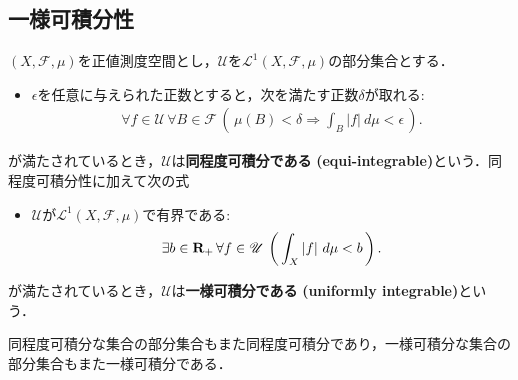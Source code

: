\subsection{一様可積分性}
	\begin{screen}
		\begin{dfn}[一様可積分]
			$(X,\mathscr{F},\mu)$を正値測度空間とし，$\mathscr{U}$を$\mathscr{L}^1(X,\mathscr{F},\mu)$の部分集合とする．
			\begin{itemize}
				\item $\epsilon$を任意に与えられた正数とすると，次を満たす正数$\delta$が取れる:
					\begin{align}
						\forall f \in \mathscr{U}\, \forall B \in \mathscr{F}\, \left(\, \mu(B) < \delta
						\Longrightarrow \int_B |f|\ d\mu < \epsilon\, \right).
					\end{align}
			\end{itemize}
			が満たされているとき，$\mathscr{U}$は{\bf 同程度可積分である}
			{\bf (equi-integrable)}という．同程度可積分性に加えて次の式
			\begin{itemize}
				\item $\mathscr{U}$が$\mathscr{L}^1(X,\mathscr{F},\mu)$で有界である:
					\begin{align}
						\exists b \in \mathbf{R}_+\, \forall f \in \mathscr{U}\, 
						\left(\, \int_X|f|\ d\mu < b\, \right).
					\end{align}
			\end{itemize}
			が満たされているとき，$\mathscr{U}$は{\bf 一様可積分である}
			{\bf (uniformly integrable)}という．
		\end{dfn}
	\end{screen}
	
	同程度可積分な集合の部分集合もまた同程度可積分であり，一様可積分な集合の部分集合もまた一様可積分である．
	
